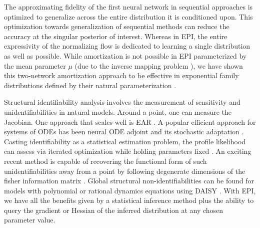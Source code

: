 \documentclass[11pt]{article}
\begin{document}
The approximating fidelity of the first neural network in sequential approaches is optimized to generalize across the entire distribution it is conditioned upon.
This optimization towards generalization of sequential methods can reduce the accuracy at the singular posterior of interest.
Whereas in EPI, the entire expressivity of the normalizing flow is dedicated to learning a single distribution as well as possible.
While amortization is not possible in EPI parameterized by the mean parameter $\mu$ (due to the inverse mapping problem \cite{wainwright2008graphical}), we have shown this two-network amortization approach to be effective in exponential family distributions defined by their natural parameterization \cite{bittner2019approximating}.

Structural identifiability analysis involves the measurement of sensitivity and unidentifiabilities in natural models.
Around a point, one can measure the Jacobian. One approach that scales well is EAR \cite{karlsson2012efficient}.
A popular efficient approach for systems of ODEs has been neural ODE adjoint \cite{chen2018neural} and its stochastic adaptation \cite{li2020scalable}.
Casting identifiability as a statistical estimation problem, the profile likelihood can assess via iterated optimization while holding parameters fixed \cite{raue2009structural}.
An exciting recent method is capable of recovering the functional form of such unidentifiabilities away from a point by following degenerate dimensions of the fisher information matrix \cite{raman2017delineating}.
Global structural non-identifiabilities can be found for models with polynomial or rational dynamics equations using DAISY \cite{saccomani2003parameter}.
With EPI, we have all the benefits given by a statistical inference method plus the ability to query the gradient or Hessian of the inferred distribution at any chosen parameter value.

\end{document}
